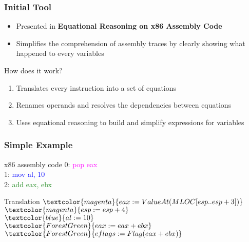 \documentclass[10pt, xcolor={dvipsnames}]{beamer}
\begin{document}
\begin{frame}
	\frametitle{Initial Tool}
	\begin{block}{}
		\begin{itemize}
			\item Presented in \textbf{Equational Reasoning on x86 Assembly Code}
			\item Simplifies the comprehension of assembly traces by clearly showing what happened to every variables
		\end{itemize}
	\end{block}
	\vfill
	\begin{block}{How does it work?}
		\begin{enumerate}
			\item Translates every instruction into a set of equations
			\item Renames operands and resolves the dependencies between equations
			\item Uses equational reasoning to build and simplify expressions for variables
		\end{enumerate}
	\end{block}
\end{frame}



\begin{frame}
	\frametitle{Simple Example}
	\begin{block}{x86 assembly code}
		0: \textcolor{magenta}{pop eax}\\
		1: \textcolor{blue}{mov al, 10}\\
		2: \textcolor{ForestGreen}{add eax, ebx}\\
	\end{block}
	\vfill
	\begin{block}{Translation}
		$\textcolor{magenta}{eax := ValueAt(MLOC[esp..esp+3])}$\\
		$\textcolor{magenta}{esp := esp + 4}$\\
		$\textcolor{blue}{al := 10}$\\
		$\textcolor{ForestGreen}{eax := eax + ebx}$\\
		$\textcolor{ForestGreen}{eflags := Flag(eax + ebx)}$
	\end{block}
\end{frame}
\end{document}

